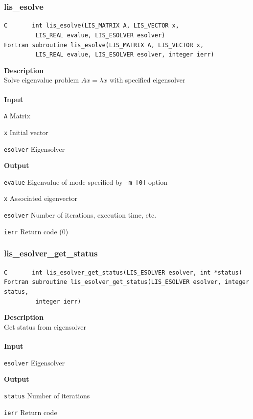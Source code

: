 \documentclass[a4paper]{article}
\newcommand{\namelistlabel}[1]{\mbox{#1}\hfill}
\newenvironment{namelist}[1]{%
 \begin{list}{}
  {\let\makelabel\namelistlabel
  \settowidth{\labelwidth}{#1}
  \setlength{\leftmargin}{1.1\labelwidth}}
}{%
\end{list}}
\begin{document}
  \subsubsection{lis\_esolve}
\begin{screen}
\verb|C       int lis_esolve(LIS_MATRIX A, LIS_VECTOR x,|\\ 
\verb|         LIS_REAL evalue, LIS_ESOLVER esolver)|\\
\verb|Fortran subroutine lis_esolve(LIS_MATRIX A, LIS_VECTOR x,|\\
\verb|         LIS_REAL evalue, LIS_ESOLVER esolver, integer ierr)|
\end{screen}
{\bf Description}\\
\indent
Solve eigenvalue problem $Ax = \lambda x$ with specified eigensolver
\\ \\
\noindent
{\bf Input}
\begin{namelist}{XXXXXXXXXXXXXXXXXXXX}
\item[\tt A] Matrix
\item[\tt x] Initial vector
\item[\tt esolver] Eigensolver
\end{namelist}
{\bf Output}
\begin{namelist}{XXXXXXXXXXXXXXXXXXXX}
\item[\tt evalue] Eigenvalue of mode specified by \verb|-m [0]| option
\item[\tt x] Associated eigenvector
\item[\tt esolver] Number of iterations, execution time, etc.
\item[\tt ierr] Return code (0)
\end{namelist}
\newpage
  \subsubsection{lis\_esolver\_get\_status}
\begin{screen}
\verb|C       int lis_esolver_get_status(LIS_ESOLVER esolver, int *status)|\\
\verb|Fortran subroutine lis_esolver_get_status(LIS_ESOLVER esolver, integer status,|\\
\verb|         integer ierr)|
\end{screen}
{\bf Description}\\
\indent
Get status from eigensolver
\\ \\
\noindent
{\bf Input}
\begin{namelist}{XXXXXXXXXXXXXXXXXXXX}
\item[\tt esolver] Eigensolver
\end{namelist}
{\bf Output}
\begin{namelist}{XXXXXXXXXXXXXXXXXXXX}
\item[\tt status] Number of iterations
\item[\tt ierr] Return code
\end{namelist}
\end{document}
